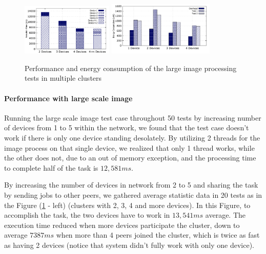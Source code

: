 \documentclass{sig-alternate}[10pt]
\begin{document}
\begin{figure}
	\centering
		\includegraphics[width=0.39\textwidth]{data/img_perf.pdf}
		\includegraphics[width=0.45\textwidth]{data/img_energy.pdf}
	\caption{Performance and energy consumption of the large image processing tests in multiple clusters}
	\label{fig:cluster_performance}
\end{figure}

\paragraph{Performance with large scale image}
Running the large scale image test case throughout 50 tests by increasing number of devices from 1 to 5 within the network, we found that the test case doesn't work if there is only one device standing desolately. By utilizing 2 threads for the image process on that single device, we realized that only 1 thread works, while the other does not, due to an out of memory exception, and the processing time to complete half of the task is $12,581ms$. 

By increasing the number of devices in network from 2 to 5 and sharing the task by sending jobs to other peers, we gathered average statistic data in 20 tests as in the Figure (\ref{fig:cluster_performance} - left) (clusters with 2, 3, 4 and more devices). In this Figure, to accomplish the task, the two devices have to work in $13,541ms$ average. The execution time reduced when more devices participate the cluster, down to average $7387ms$ when more than 4 peers joined the cluster, which is twice as fast as having 2 devices (notice that system didn't fully work with only one device).
\end{document}
